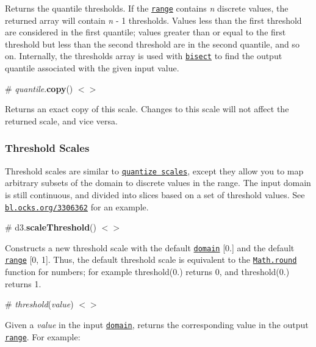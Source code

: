Returns the quantile thresholds. If the \href{#quantile_range}{\tt range} contains {\itshape n} discrete values, the returned array will contain {\itshape n} -\/ 1 thresholds. Values less than the first threshold are considered in the first quantile; values greater than or equal to the first threshold but less than the second threshold are in the second quantile, and so on. Internally, the thresholds array is used with \href{https://github.com/d3/d3-array#bisect}{\tt bisect} to find the output quantile associated with the given input value.

\label{_quantile_copy}%
\# {\itshape quantile}.{\bfseries copy}() \href{https://github.com/d3/d3-scale/blob/master/src/quantile.js#L44}{\tt $<$$>$}

Returns an exact copy of this scale. Changes to this scale will not affect the returned scale, and vice versa.

\subsubsection*{Threshold Scales}

Threshold scales are similar to \href{#quantize-scales}{\tt quantize scales}, except they allow you to map arbitrary subsets of the domain to discrete values in the range. The input domain is still continuous, and divided into slices based on a set of threshold values. See \href{http://bl.ocks.org/mbostock/3306362}{\tt bl.\+ocks.\+org/3306362} for an example.

\label{_scaleThreshold}%
\# d3.{\bfseries scale\+Threshold}() \href{https://github.com/d3/d3-scale/blob/master/src/threshold.js}{\tt $<$$>$}

Constructs a new threshold scale with the default \href{#threshold_domain}{\tt domain} \mbox{[}0.\mbox{]} and the default \href{#threshold_range}{\tt range} \mbox{[}0, 1\mbox{]}. Thus, the default threshold scale is equivalent to the \href{https://developer.mozilla.org/en/JavaScript/Reference/Global_Objects/Math/round}{\tt Math.\+round} function for numbers; for example threshold(0.) returns 0, and threshold(0.) returns 1.

\label{__threshold}%
\# {\itshape threshold}({\itshape value}) \href{https://github.com/d3/d3-scale/blob/master/src/threshold.js#L4}{\tt $<$$>$}

Given a {\itshape value} in the input \href{#threshold_domain}{\tt domain}, returns the corresponding value in the output \href{#threshold_range}{\tt range}. For example\+:


